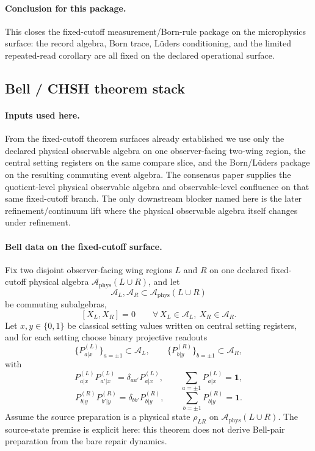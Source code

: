 \documentclass[11pt]{article}
\begin{document}
\paragraph{Conclusion for this package.}
This closes the fixed-cutoff measurement/Born-rule package on the microphysics surface: the
record algebra, Born trace, L\"uders conditioning, and the limited repeated-read corollary are
all fixed on the declared operational surface.

\subsection{Bell / CHSH theorem stack}

\paragraph{Inputs used here.}
From the fixed-cutoff theorem surfaces already established we use only the declared physical
observable algebra on one observer-facing two-wing region, the central setting registers on the
same compare slice, and the Born/L\"uders package on the resulting commuting event algebra. The
consensus paper supplies the quotient-level physical observable algebra and observable-level
confluence on that same fixed-cutoff branch. The only downstream blocker named here is the later
refinement/continuum lift where the physical observable algebra itself changes under refinement.

\paragraph{Bell data on the fixed-cutoff surface.}
Fix two disjoint observer-facing wing regions \(L\) and \(R\) on one declared fixed-cutoff
physical algebra \(\mathcal A_{\mathrm{phys}}(L\cup R)\), and let
\[
\mathcal A_L,\mathcal A_R\subset \mathcal A_{\mathrm{phys}}(L\cup R)
\]
be commuting subalgebras,
\[
[X_L,X_R]=0
\qquad
\forall\, X_L\in\mathcal A_L,\ X_R\in\mathcal A_R.
\]
Let \(x,y\in\{0,1\}\) be classical setting values written on central setting registers, and for
each setting choose binary projective readouts
\[
\{P_{a|x}^{(L)}\}_{a=\pm1}\subset\mathcal A_L,
\qquad
\{P_{b|y}^{(R)}\}_{b=\pm1}\subset\mathcal A_R,
\]
with
\[
P_{a|x}^{(L)}P_{a'|x}^{(L)}=\delta_{aa'}P_{a|x}^{(L)},
\qquad
\sum_{a=\pm1}P_{a|x}^{(L)}=\mathbf 1,
\]
\[
P_{b|y}^{(R)}P_{b'|y}^{(R)}=\delta_{bb'}P_{b|y}^{(R)},
\qquad
\sum_{b=\pm1}P_{b|y}^{(R)}=\mathbf 1.
\]
Assume the source preparation is a physical state \(\rho_{LR}\) on
\(\mathcal A_{\mathrm{phys}}(L\cup R)\). The source-state premise is explicit here: this theorem
does not derive Bell-pair preparation from the bare repair dynamics.
\end{document}
